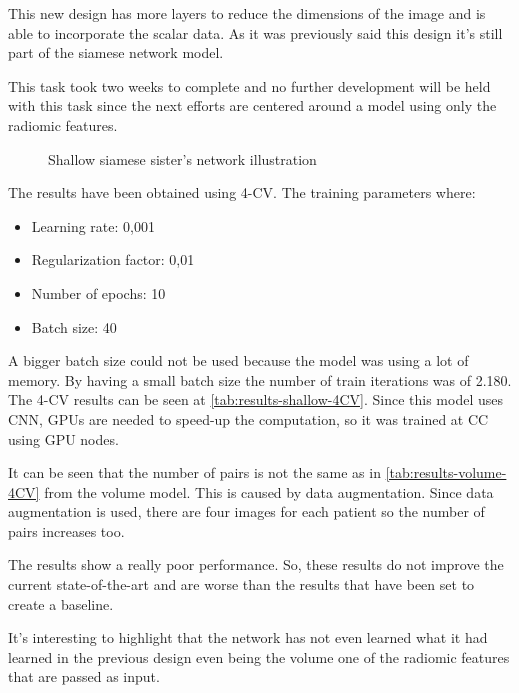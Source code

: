 This new design has more layers to reduce the dimensions of the image and is able to 
incorporate the scalar data. As it was previously said this design it's still part of the
siamese network model.

This task took two weeks to complete and no further development will be held with this task
since the next efforts are centered around a model using only the radiomic features.

\begin{figure}
  \centering
  
  \caption{Shallow siamese sister's network illustration \label{fig:shallow-implement}}
\end{figure}


The results have been obtained using 4-\gls{CV}. The training parameters where:
\begin{itemize}
  \item Learning rate: 0,001
  \item Regularization factor: 0,01
  \item Number of epochs: 10
  \item Batch size: 40
\end{itemize}
A bigger batch size could not be used because
the model was using a lot of memory. By having a small batch size the number of train 
iterations was of 2.180. The 4-\gls{CV} results can be seen at \autoref{tab:results-shallow-4CV}.
Since this model uses \gls{CNN}, \glspl{GPU} are needed to speed-up the computation, so 
it was trained at \gls{CC} using \gls{GPU} nodes.

It can be seen that the number of pairs is not the same as in \autoref{tab:results-volume-4CV} 
from the volume model. This is caused by data augmentation. Since
data augmentation is used, there are four images for each patient so the number of pairs
increases too.

The results show a really poor performance. So, these results
do not improve the current state-of-the-art and are worse than the results that have 
been set to create a baseline. 

It's interesting to highlight that the network has not even learned what it had learned in the 
previous design even being the volume one of the radiomic features
that are passed as input.


